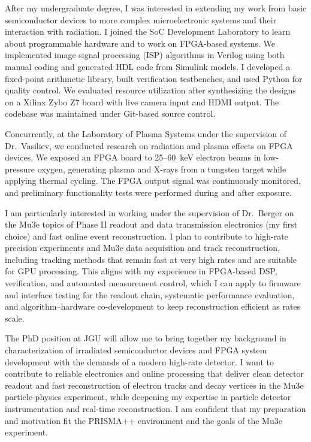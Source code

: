 \documentclass[a4paper,12pt]{article}
\begin{document}
After my undergraduate degree, I was interested in extending my work from basic semiconductor devices to more complex microelectronic systems and their interaction with radiation. I joined the SoC Development Laboratory to learn about programmable hardware and to work on FPGA-based systems. We implemented image signal processing (ISP) algorithms in Verilog using both manual coding and generated HDL code from Simulink models. I developed a fixed-point arithmetic library, built verification testbenches, and used Python for quality control. We evaluated resource utilization after synthesizing the designs on a Xilinx Zybo Z7 board with live camera input and HDMI output. The codebase was maintained under Git-based source control. 

Concurrently, at the Laboratory of Plasma Systems under the supervision of Dr.\ Vasiliev, we conducted research on radiation and plasma effects on FPGA devices. We exposed an FPGA board to 25--60~keV electron beams in low-pressure oxygen, generating plasma and X-rays from a tungsten target while applying thermal cycling. The FPGA output signal was continuously monitored, and preliminary functionality tests were performed during and after exposure.

I am particularly interested in working under the supervision of Dr.\ Berger on the Mu3e topics of Phase II readout and data transmission electronics (my first choice) and fast online event reconstruction. I plan to contribute to high-rate precision experiments and Mu3e data acquisition and track reconstruction, including tracking methods that remain fast at very high rates and are suitable for GPU processing. This aligns with my experience in FPGA-based DSP, verification, and automated measurement control, which I can apply to firmware and interface testing for the readout chain, systematic performance evaluation, and algorithm--hardware co-development to keep reconstruction efficient as rates scale.

The PhD position at JGU will allow me to bring together my background in characterization of irradiated semiconductor devices and FPGA system development with the demands of a modern high-rate detector. I want to contribute to reliable electronics and online processing that deliver clean detector readout and fast reconstruction of electron tracks and decay vertices in the Mu3e particle-physics experiment, while deepening my expertise in particle detector instrumentation and real-time reconstruction. I am confident that my preparation and motivation fit the PRISMA++ environment and the goals of the Mu3e experiment.
\end{document}
